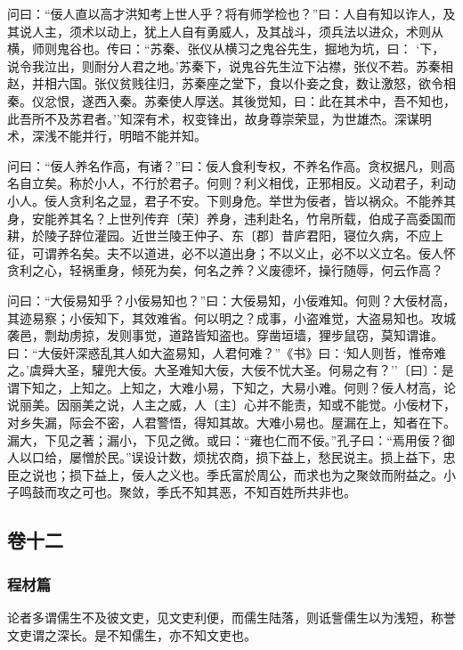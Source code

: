 \documentclass[]{article}
\begin{document}
问曰：``佞人直以高才洪知考上世人乎？将有师学检也？''曰：人自有知以诈人，及其说人主，须术以动上，犹上人自有勇威人，及其战斗，须兵法以进众，术则从横，师则鬼谷也。传曰：``苏秦、张仪从横习之鬼谷先生，掘地为坑，曰：
`下，说令我泣出，则耐分人君之地。'苏秦下，说鬼谷先生泣下沾襟，张仪不若。苏秦相赵，并相六国。张仪贫贱往归，苏秦座之堂下，食以仆妾之食，数让激怒，欲令相秦。仪忿恨，遂西入秦。苏秦使人厚送。其後觉知，曰：此在其术中，吾不知也，此吾所不及苏君者。''知深有术，权变锋出，故身尊崇荣显，为世雄杰。深谋明术，深浅不能并行，明暗不能并知。

问曰：``佞人养名作高，有诸？''曰：佞人食利专权，不养名作高。贪权据凡，则高名自立矣。称於小人，不行於君子。何则？利义相伐，正邪相反。义动君子，利动小人。佞人贪利名之显，君子不安。下则身危。举世为佞者，皆以祸众。不能养其身，安能养其名？上世列传弃〔荣〕养身，违利赴名，竹帛所载，伯成子高委国而耕，於陵子辞位灌园。近世兰陵王仲子、东〔郡〕昔庐君阳，寝位久病，不应上征，可谓养名矣。夫不以道进，必不以道出身；不以义止，必不以义立名。佞人怀贪利之心，轻祸重身，倾死为矣，何名之养？义废德坏，操行随辱，何云作高？

问曰：``大佞易知乎？小佞易知也？''曰：大佞易知，小佞难知。何则？大佞材高，其迹易察；小佞知下，其效难省。何以明之？成事，小盗难觉，大盗易知也。攻城袭邑，剽劫虏掠，发则事觉，道路皆知盗也。穿凿垣墙，狸步鼠窃，莫知谓谁。曰：``大佞奸深惑乱其人如大盗易知，人君何难？''《书》曰：`知人则哲，惟帝难之。'虞舜大圣，驩兜大佞。大圣难知大佞，大佞不忧大圣。何易之有？''〔曰〕：是谓下知之，上知之。上知之，大难小易，下知之，大易小难。何则？佞人材高，论说丽美。因丽美之说，人主之威，人〔主〕心并不能责，知或不能觉。小佞材下，对乡失漏，际会不密，人君警悟，得知其故。大难小易也。屋漏在上，知者在下。漏大，下见之著；漏小，下见之微。或曰：``雍也仁而不佞。''孔子曰：``焉用佞？御人以口给，屡憎於民。''误设计数，烦扰农商，损下益上，愁民说主。损上益下，忠臣之说也；损下益上，佞人之义也。季氏富於周公，而求也为之聚敛而附益之。小子鸣鼓而攻之可也。聚敛，季氏不知其恶，不知百姓所共非也。

\hypertarget{header-n523}{%
\subsection{卷十二}\label{header-n523}}

\hypertarget{header-n524}{%
\subsubsection{程材篇}\label{header-n524}}

论者多谓儒生不及彼文吏，见文吏利便，而儒生陆落，则诋訾儒生以为浅短，称誉文吏谓之深长。是不知儒生，亦不知文吏也。
\end{document}
